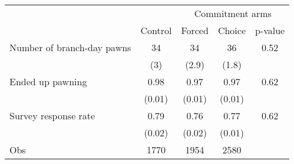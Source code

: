 \begin{tabular}{lcccc}
\toprule
      &       & \multicolumn{3}{c}{Commitment arms} \\
\cmidrule{3-5}      & Control & Forced & Choice & p-value \\
\midrule
\midrule
Number of branch-day pawns & 34    & 34    & 36    & 0.52 \\
      & (3)   & (2.9) & (1.8) &  \\
\multicolumn{1}{p{12.82em}}{Ended up pawning} & 0.98  & 0.97  & 0.97  & 0.62 \\
      & (0.01) & (0.01) & (0.01) &  \\
Survey response rate & 0.79  & 0.76  & 0.77  & 0.62 \\
      & (0.02) & (0.02) & (0.01) &  \\
\midrule
Obs   & 1770  & 1954  & 2580  &  \\
\bottomrule
\bottomrule
\end{tabular}%
